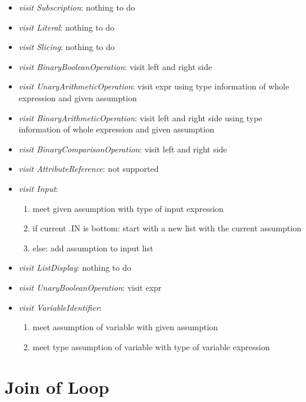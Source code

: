 \documentclass[11pt]{article}
\begin{document}
\begin{itemize}
\item \textit{visit Subscription}: nothing to do
\item \textit{visit Literal}: nothing to do
\item \textit{visit Slicing}: nothing to do
\item \textit{visit BinaryBooleanOperation}: visit left and right side
\item \textit{visit UnaryArithmeticOperation}: visit expr using type information of whole expression and given assumption
\item \textit{visit BinaryArithmeticOperation}: visit left and right side using type information of whole expression and given assumption
\item \textit{visit BinaryComparisonOperation}: visit left and right side
\item \textit{visit AttributeReference}: not supported
\item \textit{visit Input}: 
\begin{enumerate}
\item meet given assumption with type of input expression
\item if current .IN is bottom: start with a new list with the current assumption
\item else: add assumption to input list
\end{enumerate}
\item \textit{visit ListDisplay}: nothing to do
\item \textit{visit UnaryBooleanOperation}: visit expr
\item \textit{visit VariableIdentifier}:
\begin{enumerate}
\item meet assumption of variable with given assumption
\item meet type assumption of variable with type of variable expression
\end{enumerate}
\end{itemize}

\section{Join of Loop}
\end{document}
